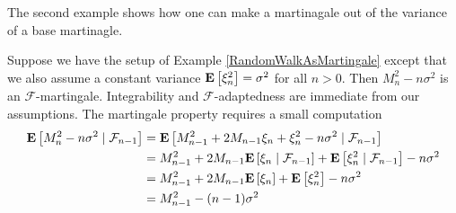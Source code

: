 The second example shows how one can make a martinagale out of the
variance of a base martinagle.
\begin{examp}Suppose we have the setup of Example
  \ref{RandomWalkAsMartingale} except that we also assume a constant variance
  $\expectation{\xi_n^2} = \sigma^2$ for all $n > 0$.  Then $M_n^2 - n
  \sigma^2$ is an $\mathcal{F}$-martingale.  Integrability and
  $\mathcal{F}$-adaptedness are immediate from our assumptions.  The
  martingale property requires a small computation
\begin{align*}
\cexpectationlong{\mathcal{F}_{n-1}}{M_n^2 - n \sigma^2} &=
\cexpectationlong{\mathcal{F}_{n-1}}{M_{n-1}^2 + 2 M_{n-1} \xi_n +
  \xi_n^2 - n \sigma^2} \\
&=M_{n-1}^2 +  2 M_{n-1} \cexpectationlong{\mathcal{F}_{n-1}}{\xi_n}
+  \cexpectationlong{\mathcal{F}_{n-1}}{ \xi_n^2} - n \sigma^2 \\
&=M_{n-1}^2 +  2 M_{n-1} \expectation{\xi_n}
+  \expectation{ \xi_n^2} - n \sigma^2 \\
&= M_{n-1}^2 - (n-1)\sigma^2
\end{align*}
\end{examp}


